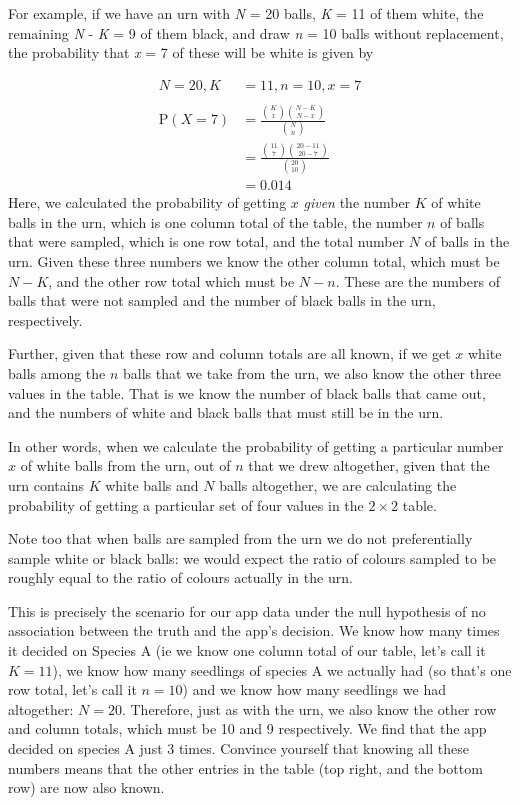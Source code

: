 \documentclass[
  letterpaper,
  DIV=11,
  numbers=noendperiod]{scrreprt}
\begin{document}
For example, if we have an urn with \emph{N} = 20 balls, \emph{K} = 11
of them white, the remaining \emph{N} - \emph{K} = 9 of them black, and
draw \emph{n} = 10 balls without replacement, the probability that
\emph{x} = 7 of these will be white is given by

\[
\begin{align*}
N=20, K&=11, n=10, x=7\\
\\
\text{P}(X=7)& =\frac{{K \choose x} {{N-K} \choose {N-x}}}{N\choose n}\\
&=\frac{{11 \choose 7} {{20-11} \choose {20-7}}}{20\choose 10}\\
&= 0.014
\end{align*}
\] Here, we calculated the probability of getting \(x\) \emph{given} the
number \(K\) of white balls in the urn, which is one column total of the
table, the number \(n\) of balls that were sampled, which is one row
total, and the total number \(N\) of balls in the urn. Given these three
numbers we know the other column total, which must be \(N-K\), and the
other row total which must be \(N-n\). These are the numbers of balls
that were not sampled and the number of black balls in the urn,
respectively.

Further, given that these row and column totals are all known, if we get
\(x\) white balls among the \(n\) balls that we take from the urn, we
also know the other three values in the table. That is we know the
number of black balls that came out, and the numbers of white and black
balls that must still be in the urn.

In other words, when we calculate the probability of getting a
particular number \(x\) of white balls from the urn, out of \(n\) that
we drew altogether, given that the urn contains \(K\) white balls and
\(N\) balls altogether, we are calculating the probability of getting a
particular set of four values in the \(2 \times 2\) table.

Note too that when balls are sampled from the urn we do not
preferentially sample white or black balls: we would expect the ratio of
colours sampled to be roughly equal to the ratio of colours actually in
the urn.

This is precisely the scenario for our app data under the null
hypothesis of no association between the truth and the app's decision.
We know how many times it decided on Species A (ie we know one column
total of our table, let's call it \(K = 11\)), we know how many
seedlings of species A we actually had (so that's one row total, let's
call it \(n = 10\)) and we know how many seedlings we had altogether:
\(N = 20\). Therefore, just as with the urn, we also know the other row
and column totals, which must be 10 and 9 respectively. We find that the
app decided on species A just 3 times. Convince yourself that knowing
all these numbers means that the other entries in the table (top right,
and the bottom row) are now also known.
\end{document}

